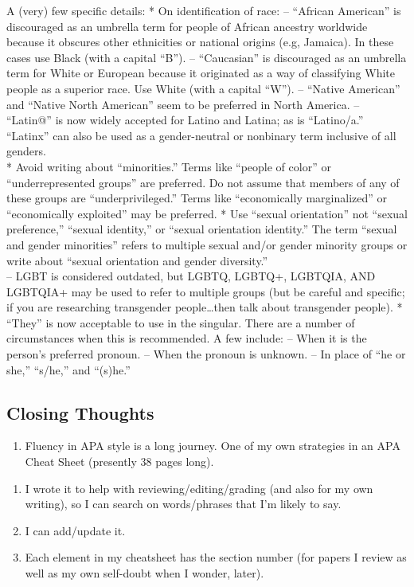 \documentclass[
  11pt,
]{book}
\providecommand{\tightlist}{%
  \setlength{\itemsep}{0pt}\setlength{\parskip}{0pt}}
\begin{document}
A (very) few specific details:
* On identification of race:
-- ``African American'' is discouraged as an umbrella term for people of African ancestry worldwide because it obscures other ethnicities or national origins (e.g, Jamaica). In these cases use Black (with a capital ``B'').
-- ``Caucasian'' is discouraged as an umbrella term for White or European because it originated as a way of classifying White people as a superior race. Use White (with a capital ``W'').
-- ``Native American'' and ``Native North American'' seem to be preferred in North America.
-- ``Latin@'' is now widely accepted for Latino and Latina; as is ``Latino/a.'' ``Latinx'' can also be used as a gender-neutral or nonbinary term inclusive of all genders.\\
* Avoid writing about ``minorities.'' Terms like ``people of color'' or ``underrepresented groups'' are preferred. Do not assume that members of any of these groups are ``underprivileged.'' Terms like ``economically marginalized'' or ``economically exploited'' may be preferred.
* Use ``sexual orientation'' not ``sexual preference,'' ``sexual identity,'' or ``sexual orientation identity.'' The term ``sexual and gender minorities'' refers to multiple sexual and/or gender minority groups or write about ``sexual orientation and gender diversity.''\\
-- LGBT is considered outdated, but LGBTQ, LGBTQ+, LGBTQIA, AND LGBTQIA+ may be used to refer to multiple groups (but be careful and specific; if you are researching transgender people\ldots then talk about transgender people).
* ``They'' is now acceptable to use in the singular. There are a number of circumstances when this is recommended. A few include:
-- When it is the person's preferred pronoun.
-- When the pronoun is unknown.
-- In place of ``he or she,'' ``s/he,'' and ``(s)he.''

\hypertarget{closing-thoughts}{%
\subsection{Closing Thoughts}\label{closing-thoughts}}

\begin{enumerate}
\def\labelenumi{\arabic{enumi}.}
\tightlist
\item
  Fluency in APA style is a long journey. One of my own strategies in an APA Cheat Sheet (presently 38 pages long).
\end{enumerate}

\begin{enumerate}
\def\labelenumi{\alph{enumi}.}
\tightlist
\item
  I wrote it to help with reviewing/editing/grading (and also for my own writing), so I can search on words/phrases that I'm likely to say.
\item
  I can add/update it.
\item
  Each element in my cheatsheet has the section number (for papers I review as well as my own self-doubt when I wonder, later).
\end{enumerate}
\end{document}
